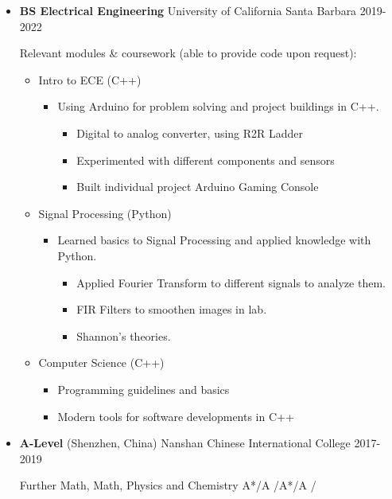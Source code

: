   \begin{itemize}
    \def\ongoing{%
    }
    \item \ongoing{} \textbf{BS Electrical Engineering} \dashdiv{} University of California Santa Barbara \dashdiv{} 2019-2022

      Relevant modules \& coursework (able to provide code upon request):

      \begin{itemize}

        \item Intro to ECE (C++)

        \begin{itemize}
          \item Using Arduino for problem solving and project buildings in C++.

          \begin{itemize}
            \item Digital to analog converter, using R2R Ladder
            \item Experimented with different components and sensors
            \item Built individual project \dashdiv{} Arduino Gaming Console
          \end{itemize}
        \end{itemize}

        \item Signal Processing (Python)

        \begin{itemize}
          \item Learned basics to Signal Processing and applied knowledge with Python.
          \begin{itemize}
            \item Applied Fourier Transform to different signals to analyze them.
            \item FIR Filters to smoothen images in lab.
            \item Shannon's theories.
          \end{itemize}
        \end{itemize}

        \item Computer Science (C++)

        \begin{itemize}
          \item Programming guidelines and basics
          \item Modern tools for software developments in C++
        \end{itemize}
      \end{itemize}

    \item \textbf{A-Level} \dashdiv{} (Shenzhen, China) Nanshan Chinese International College \dashdiv{} 2017-2019

      Further Math, Math, Physics and Chemistry \dashdiv{} A*/A /A*/A /
  \end{itemize}

